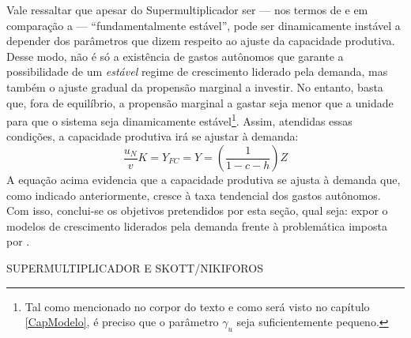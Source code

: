 Vale ressaltar que apesar do Supermultiplicador ser --- nos termos de \textcite{hicks_capital_1965} e em comparação a \textcite{harrod_essay_1939} --- ``fundamentalmente estável'', pode ser dinamicamente instável a depender dos parâmetros que dizem respeito ao ajuste da capacidade produtiva. Desse modo, não é só a existência de gastos autônomos que garante a possibilidade de um \textit{estável} regime de crescimento liderado pela demanda, mas também o ajuste gradual da propensão marginal a investir. No entanto, basta que, fora de equilíbrio, a propensão marginal a gastar seja menor que a unidade para que o sistema seja dinamicamente estável\footnote{Tal como mencionado no corpor do texto e como será visto no capítulo \ref{CapModelo}, é preciso que o parâmetro $\gamma_u$ seja suficientemente pequeno.}. Assim, atendidas essas condições, a capacidade produtiva irá se ajustar à demanda:
$$
 \frac{u_N}{v}K = Y_{FC} = Y = \left(\frac{1}{1 - c - h}\right)Z
$$
A equação acima evidencia que a capacidade produtiva se ajusta à demanda que, como indicado anteriormente, cresce à taxa tendencial dos gastos autônomos. Com isso, conclui-se os objetivos pretendidos por esta seção, qual seja: expor o modelos de crescimento liderados pela demanda frente à problemática imposta por \textcite{harrod_essay_1939}. 

SUPERMULTIPLICADOR E SKOTT/NIKIFOROS

\begin{comment}
Antes de prosseguir para a discussão sobre a convergência do grau de utilização, é necessário pontuar uma qualificação quanto o papel das expectativas no supermultiplicador. \textcite[p.~87]{serrano_long_1995} reconhece que o grau de utilização pode não convergir ao normal, mas tal resultado decorre de formulações \textbf{persistentemente} erradas sobre a evolução da demanda efetiva. Em resposta à esse argumento, \textcites{allain_macroeconomic_2014}{palley_economics_2018} afirmam que a instabilidade harrodiana é eliminada no Supermultiplicador por hipótese.

Vale notar que a exposição anterior permitiu apresentar a resolução desse problema sem recorrer à suposições sobre a formulação das expectativas. Desse modo, dizer que o Supermultiplicador Sraffiano resolve a instabilidade Harrodiana por meio de hipóteses expectacionais não contempla de forma adequada o papel desempenhado pelo investimento induzido e dão muita ênfase à existência de gastos autônomos. Uma implicação dessa incompreensão é o esforço da literatura Kaleckiana em garantir os resultados do modelo canônico na presença de gastos autônomos sem abandonar a ideia de que o investimento produtivo é autônomo no longo prazo. Tal discussão é endereçada parcialmente na seção seguinte.
\end{comment}